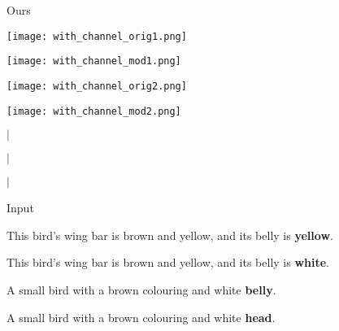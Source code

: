 \documentclass{article}
\begin{document}
\begin{figure}[t]
\begin{minipage}{0.48\textwidth}
\begin{minipage}{0.184\textwidth}
\centering
\tiny{Ours}
\end{minipage}
\begin{minipage}{0.184\textwidth}
\texttt{[image: with\_channel\_orig1.png]}
\end{minipage}
\noindent\begin{minipage}{0.184\textwidth}
\texttt{[image: with\_channel\_mod1.png]}
\end{minipage}
\noindent\begin{minipage}{0.184\textwidth}
\texttt{[image: with\_channel\_orig2.png]}
\end{minipage}
\noindent\begin{minipage}{0.184\textwidth}
\texttt{[image: with\_channel\_mod2.png]}
\end{minipage}
\end{minipage}
\begin{minipage}{0.01\textwidth}
\centering
$\Bigg\vert$

$\Bigg\vert$

$\Bigg\vert$
\end{minipage}
\begin{minipage}{0.48\textwidth}
\noindent\begin{minipage}{0.184\textwidth}
\centering
\tiny{Input}
\end{minipage}
\noindent\begin{minipage}{0.184\textwidth}
\centering
\tiny{This bird's wing bar is brown and yellow, and its belly is \textbf{yellow}.}
\end{minipage}
\noindent\begin{minipage}{0.184\textwidth}
\centering
\tiny{This bird's wing bar is brown and yellow, and its belly is \textbf{white}.}
\end{minipage}
\noindent\begin{minipage}{0.184\textwidth}
\centering
\tiny{A small bird with a brown colouring and white \textbf{belly}.}
\end{minipage}
\noindent\begin{minipage}{0.184\textwidth}
\centering
\tiny{A small bird with a brown colouring and white \textbf{head}.}
\end{minipage}
\smallskip


\end{minipage}
\end{figure}
\end{document}
